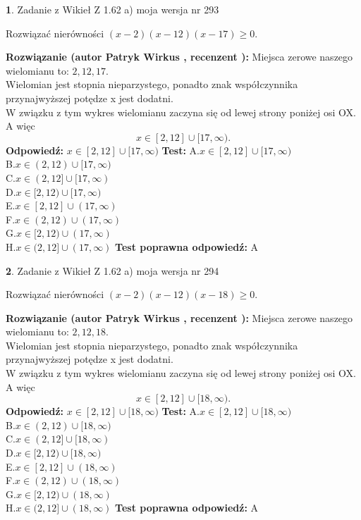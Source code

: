 \documentclass[12pt, a4paper]{article}
\theoremstyle{definition} %
\newtheorem{zad}{}
\newcommand{\zadStart}[1]{\begin{zad}#1\newline}
\newcommand{\zadStop}{\end{zad}}
\newcommand{\rozwStart}[2]{\noindent \textbf{Rozwiązanie (autor #1 , recenzent #2): }\newline}
\newcommand{\rozwStop}{\newline}
\newcommand{\odpStart}{\noindent \textbf{Odpowiedź:}\newline}
\newcommand{\odpStop}{\newline}
\newcommand{\testStart}{\noindent \textbf{Test:}\newline}
\newcommand{\testStop}{\newline}
\newcommand{\kluczStart}{\noindent \textbf{Test poprawna odpowiedź:}\newline}
\newcommand{\kluczStop}{\newline}
\begin{document}
\zadStart{Zadanie z Wikieł Z 1.62 a) moja wersja nr 293}

Rozwiązać nierówności $(x-2)(x-12)(x-17)\ge0$.
\zadStop
\rozwStart{Patryk Wirkus}{}
Miejsca zerowe naszego wielomianu to: $2, 12, 17$.\\
Wielomian jest stopnia nieparzystego, ponadto znak współczynnika przy\linebreak najwyższej potędze x jest dodatni.\\ W związku z tym wykres wielomianu zaczyna się od lewej strony poniżej osi OX. A więc $$x \in [2,12] \cup [17,\infty).$$
\rozwStop
\odpStart
$x \in [2,12] \cup [17,\infty)$
\odpStop
\testStart
A.$x \in [2,12] \cup [17,\infty)$\\
B.$x \in (2,12) \cup [17,\infty)$\\
C.$x \in (2,12] \cup [17,\infty)$\\
D.$x \in [2,12) \cup [17,\infty)$\\
E.$x \in [2,12] \cup (17,\infty)$\\
F.$x \in (2,12) \cup (17,\infty)$\\
G.$x \in [2,12) \cup (17,\infty)$\\
H.$x \in (2,12] \cup (17,\infty)$
\testStop
\kluczStart
A
\kluczStop



\zadStart{Zadanie z Wikieł Z 1.62 a) moja wersja nr 294}

Rozwiązać nierówności $(x-2)(x-12)(x-18)\ge0$.
\zadStop
\rozwStart{Patryk Wirkus}{}
Miejsca zerowe naszego wielomianu to: $2, 12, 18$.\\
Wielomian jest stopnia nieparzystego, ponadto znak współczynnika przy\linebreak najwyższej potędze x jest dodatni.\\ W związku z tym wykres wielomianu zaczyna się od lewej strony poniżej osi OX. A więc $$x \in [2,12] \cup [18,\infty).$$
\rozwStop
\odpStart
$x \in [2,12] \cup [18,\infty)$
\odpStop
\testStart
A.$x \in [2,12] \cup [18,\infty)$\\
B.$x \in (2,12) \cup [18,\infty)$\\
C.$x \in (2,12] \cup [18,\infty)$\\
D.$x \in [2,12) \cup [18,\infty)$\\
E.$x \in [2,12] \cup (18,\infty)$\\
F.$x \in (2,12) \cup (18,\infty)$\\
G.$x \in [2,12) \cup (18,\infty)$\\
H.$x \in (2,12] \cup (18,\infty)$
\testStop
\kluczStart
A
\kluczStop
\end{document}
